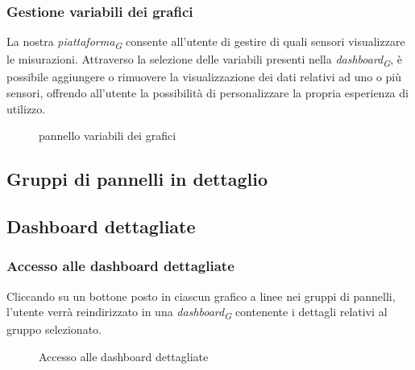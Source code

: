 \subsubsection{Gestione variabili dei grafici}
\hypertarget{par:gestione_variabili_panel}{}
La nostra \textit{piattaforma}\textsubscript{\textit{G}} consente all'utente di gestire di quali sensori visualizzare le misurazioni. Attraverso la selezione delle variabili presenti nella \textit{dashboard}\textsubscript{\textit{G}}, è possibile aggiungere o rimuovere la visualizzazione dei dati relativi ad uno o più sensori, offrendo all'utente la possibilità di personalizzare la propria esperienza di utilizzo. 
\begin{figure}[H]
    \centering
    \caption{pannello variabili dei grafici}
    \label{fig:my_label}
\end{figure}


\subsection{Gruppi di pannelli in dettaglio}




\subsection{Dashboard dettagliate}
\subsubsection{Accesso alle dashboard dettagliate}
Cliccando su un bottone posto in ciascun grafico a linee nei gruppi di pannelli, l'utente verrà reindirizzato in una \textit{dashboard}\textsubscript{\textit{G}} contenente i dettagli relativi al gruppo selezionato. 
\begin{figure}[H]
    \centering
    \caption{Accesso alle dashboard dettagliate}
    \label{fig:my_label}
\end{figure}

